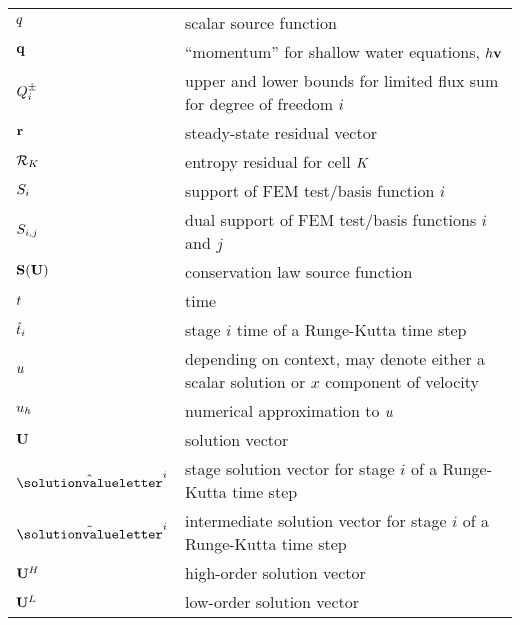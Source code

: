\begin{center}
\begin{longtable}{l p{4.8in}}
$q$    & scalar source function\\
$\mathbf{q}$  & ``momentum'' for shallow water equations,
                     $h\mathbf{v}$\\
$Q^\pm_i$ & upper and lower bounds for limited flux sum for degree
                        of freedom $i$\\
$\mathbf{r}$           & steady-state residual vector\\
$\mathcal{R}_K$ & entropy residual for cell $K$\\
$S_i$       & support of FEM test/basis function $i$\\
$S_{i,j}$      & dual support of FEM test/basis functions $i$ and $j$\\
$\mathbf{S}(\mathbf{U})$      & conservation law source function\\
$t$       & time\\

$\hat{t}_i$   & stage $i$ time of a Runge-Kutta time step\\
$u$  & depending on context, may denote either a scalar solution or
                     $x$ component of velocity\\
$u_h$ & numerical approximation to $u$\\
$\mathbf{U}$  & solution vector\\
$\RKstagesolution^i$ & stage solution vector for stage $i$ of a Runge-Kutta time
                       step\\
$\RKintermediatesolution^i$ & intermediate solution vector for stage $i$ of a
                              Runge-Kutta time step\\
$\mathbf{U}^H$ & high-order solution vector\\
$\mathbf{U}^L$ & low-order solution vector\\


\end{longtable}
\end{center}
